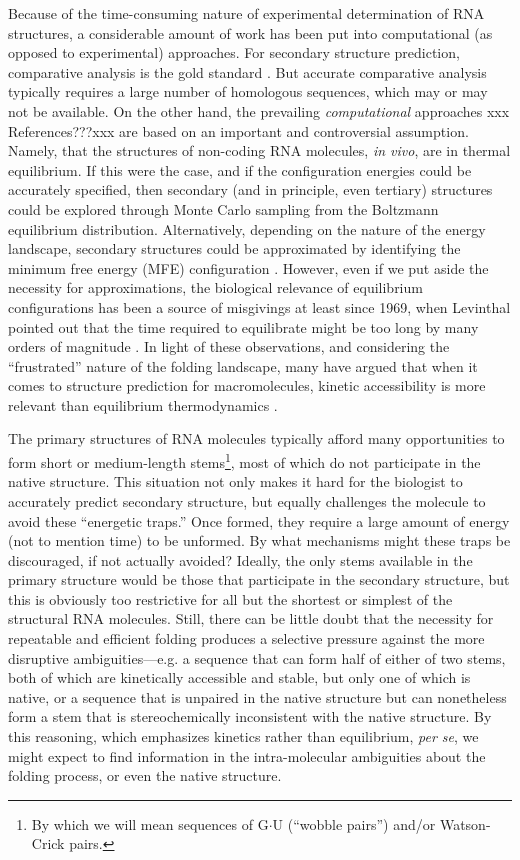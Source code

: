\documentclass[10pt,letterpaper]{article}
\begin{document}
Because of the time-consuming nature of experimental determination of RNA structures, a considerable amount of work has been put into computational (as opposed to experimental) approaches. For secondary structure prediction, comparative analysis is the gold standard  \cite{Gutell1992-hu}. But accurate comparative analysis typically requires a large number of homologous sequences, which may or may not be available. On the other hand, the prevailing {\em computational} approaches  xxx References???xxx are based on an important and controversial assumption. Namely, that the structures of  non-coding RNA molecules, {\em in vivo}, are in thermal equilibrium. If this were the case, and if the configuration energies could be accurately specified, then secondary (and in principle, even tertiary) structures could be explored through Monte Carlo sampling from the Boltzmann equilibrium distribution. Alternatively, depending on the nature of the energy landscape, secondary structures could be approximated by identifying the minimum free energy (MFE) configuration  \cite{Mathews1999-hc,Zuker1999-rc}. However, even if we put aside the necessity for approximations, the biological relevance of equilibrium configurations has been a source of misgivings at least since 1969, when Levinthal pointed out that the time required to equilibrate might be too long by many orders of magnitude  \cite{Levinthal1969-hi}. In light of these observations, and considering the ``frustrated'' nature of the folding landscape, many have argued that when it comes to structure prediction for macromolecules, kinetic accessibility is more relevant than equilibrium thermodynamics  \cite{Higgs2000-gj,Flamm2008-ir,Baker1994-px}.

The primary structures of RNA molecules typically afford many opportunities to form short or medium-length stems\footnote{
By which we will mean sequences of G$\cdot$U (``wobble pairs'') and/or Watson-Crick pairs.},
most of which do not participate in the native structure. This situation not only makes it hard for the biologist to accurately predict secondary structure, but equally challenges the molecule to avoid these ``energetic traps.'' Once formed, they require a large amount of energy (not to mention time) to be unformed. By what mechanisms might these traps be discouraged, if not actually avoided? 
Ideally, the only stems available in the primary structure would be those that participate in the secondary structure, but this is obviously too restrictive for all but the shortest or simplest of the structural RNA molecules. Still, there can be little doubt that the necessity for repeatable and efficient folding produces a selective pressure against the more disruptive ambiguities---e.g.
a sequence that can form half of either of two stems, both of which are kinetically accessible and stable, but only one of which is native, or a sequence that is unpaired in the native structure but can nonetheless form a stem that is stereochemically inconsistent with the native structure. By this reasoning, which emphasizes kinetics rather than equilibrium, {\em per se}, we might expect to find information in the intra-molecular ambiguities about the folding process, or even the native structure.  
\end{document}
